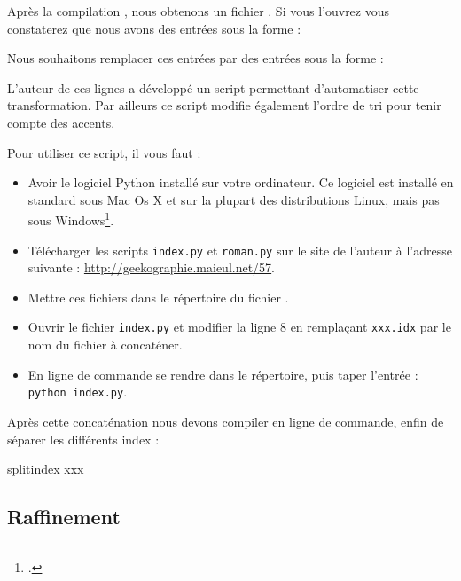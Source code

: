 Après la  compilation \XeLaTeX, nous obtenons un fichier . Si vous l'ouvrez vous constaterez que nous avons des entrées sous la forme : 

\begin{latexcode}
\end{latexcode}

Nous souhaitons remplacer ces entrées par des entrées sous la forme :

\begin{latexcode}
\end{latexcode}

L'auteur de ces lignes a développé un script permettant d'automatiser cette transformation. Par ailleurs ce script modifie également l'ordre de tri pour tenir compte des accents.

Pour utiliser ce script, il vous faut :\label{python}
\begin{itemize}
\item Avoir le logiciel Python installé sur votre ordinateur. Ce logiciel est installé en standard sous Mac Os X et sur la plupart des distributions Linux, mais pas sous Windows\footcite{python_windows}.
\item Télécharger les scripts \verb|index.py| et \verb|roman.py| sur le site de l'auteur à l'adresse suivante : \url{http://geekographie.maieul.net/57}.
\item Mettre ces fichiers dans le répertoire du fichier . 
\item Ouvrir le fichier \verb|index.py| et modifier la ligne 8 en remplaçant \verb|xxx.idx| par le nom du fichier à concaténer.
\item En ligne de commande se rendre dans le  répertoire, puis taper l'entrée : \verb|python index.py|.
\end{itemize}


Après cette concaténation nous devons compiler en ligne de commande, enfin de séparer les différents index :

\begin{bashcode}
splitindex xxx
\end{bashcode}


\subsection{Raffinement}

